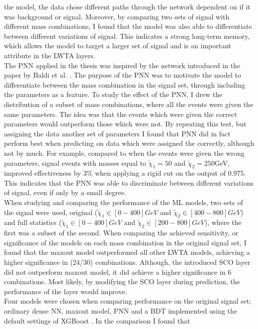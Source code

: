 the model, the data chose different paths through the network dependent on if it was background or signal. Moreover, by comparing two sets of signal with different mass combinations, I found that the model 
was also able to differentiate between different variations of signal. This indicates a strong long-term memory, which allows the model to target a larger set of signal and is an important attribute
in the \ac{LWTA} layers.
\\
The \ac{PNN} applied in the thesis was inspired by the network introduced in the paper by Baldi et al. \cite{PNN}. The purpose of the \ac{PNN} was to motivate the model to differentiate between the mass combination 
in the signal set, through including the parameters as a feature. To study the effect of the \ac{PNN}, I drew the distribution of a subset of mass combinations, where all the events were given the same parameters.
The idea was that the events which were given the correct parameters would outperform those which were not. By repeating this test, but assigning the data another set of parameters I found that \ac{PNN} did in fact 
perform best when predicting on data which were assigned the correctly, although not by much. For example, compared to when the events were given the wrong parameters, signal events with masses equal to $\tilde{\chi}_1=50$ 
and $\tilde{\chi}_2=250$GeV, improved effectiveness by $3\%$ when applying a rigid cut on the output of 0.975. This indicates that the \ac{PNN} was able to discriminate between different variations of signal, even if only by a small degree.
\\
When studying and comparing the performance of the \ac{ML} models, two sets of the signal were used, original ($\tilde{\chi}_1\in[0-400]GeV$ and  $\tilde{\chi}_2\in[400-800]GeV$) and full statistics ($\tilde{\chi}_1\in[0-400]GeV$ 
and  $\tilde{\chi}_2\in[200-800]GeV$), where the first was a subset of the second. When comparing the achieved sensitivity, or significance of the models on each mass combination in the original signal set, I found that the 
maxout model outperformed all other \ac{LWTA} models, achieving a higher significance in (24/30) combinations. Although, the introduced \ac{SCO} layer did not outperform maxout model, it did achieve a higher significance in 6 
combinations. Most likely, by modifying the \ac{SCO} layer during prediction, the performance of the layer would improve.
\\
Four models were chosen when comparing performance on the original signal set; ordinary dense \ac{NN}, maxout model, \ac{PNN} and a \ac{BDT} implemented using the default settings of XGBoost \cite{XGB}. In the comparison I found that 
